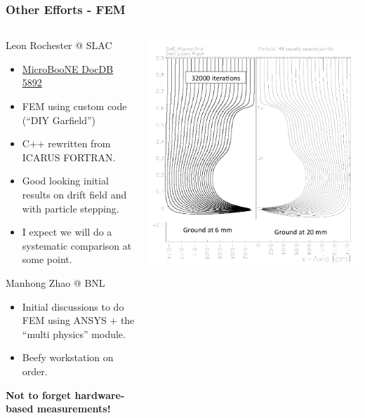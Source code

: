 \documentclass[xcolor=dvipsnames]{beamer}
\newcommand{\microboone}{MicroBooNE\xspace}
\begin{document}
\begin{frame}
  \frametitle{Other Efforts - FEM}
  \begin{columns}
    \begin{column}{0.5\textwidth}
      \footnotesize

      Leon Rochester @ SLAC
      \begin{itemize}\scriptsize
      \item \href{http://microboone-docdb.fnal.gov:8080/cgi-bin/ShowDocument?docid=5892}{\microboone DocDB 5892}
      \item FEM using custom code (``DIY Garfield'')
      \item C++ rewritten from ICARUS FORTRAN.
      \item Good looking initial results on drift field and with particle stepping.
      \item I expect we will do a systematic comparison at some point.
      \end{itemize}
      Manhong Zhao @ BNL
      \begin{itemize}\scriptsize
      \item Initial discussions to do FEM using ANSYS + the ``multi physics'' module.
      \item Beefy workstation on order.
      \end{itemize}
      \vspace{3mm}
      \textbf{Not to forget hardware-based measurements!}
    \end{column}
    \begin{column}{0.5\textwidth}
      \begin{center}
        \includegraphics[width=\textwidth]{leon-32kiter.png}


\end{center}
\end{column}
\end{columns}
\end{frame}
\end{document}
